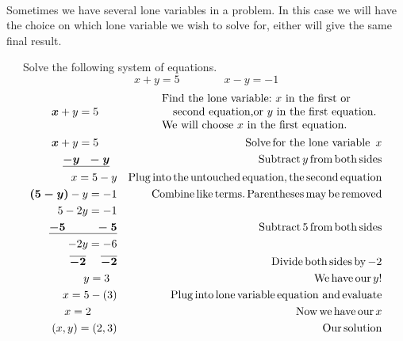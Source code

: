 \vspace{.5in}
~\\

Sometimes we have several lone variables in a problem. In this case we will
have the choice on which lone variable we wish to solve for, either will give
the same final result.

\begin{example}~~~Solve the following system of equations.
    $$x + y = 5\qquad\qquad x - y = - 1$$
  \begin{eqnarray*}
\boldsymbol{x} + y = 5~~~~~ &  & \begin{array}{l}
      \text{Find the lone variable:~}x \text{~in the first or}\\
			\text{~~~second equation,} \text{or~} y \text{~in the first equation.}\\ \text{We will choose~} x \text{~in the first equation}.
    \end{array}\\
    \boldsymbol{x} + y = 5~~~~~ &  & \operatorname{Solve} \operatorname{for~the~lone~variable~} x\\
    \boldsymbol{\underline{- y ~~- y}}~~ &  &  \operatorname{Subtract} y \operatorname{from} \operatorname{both} \operatorname{sides}\\
    x = 5 - y &  & \operatorname{Plug} \operatorname{into} \operatorname{the} \operatorname{untouched}
    \operatorname{equation}, \operatorname{the} \operatorname{second} \operatorname{equation}\\
    \boldsymbol{(5 - y)} - y = - 1 &  & \operatorname{Combine}
    \operatorname{like} \operatorname{terms.} \operatorname{Parentheses}
    \operatorname{may} \operatorname{be} \operatorname{removed} \\
    5 - 2 y = - 1 &  &\\
    \boldsymbol{\underline{- 5 ~~~~~~~~- 5}} &  &  \operatorname{Subtract} 5 \operatorname{from} \operatorname{both}
    \operatorname{sides}\\
    - 2 y = - 6 &  &\\
    \boldsymbol{\overline{- 2} ~~~~ \overline{- 2}} &  &  \operatorname{Divide} \operatorname{both} \operatorname{sides} \operatorname{by} - 2\\
    y = 3~~ &  & \operatorname{We} \operatorname{have} \operatorname{our} y!\\
    x = 5 - (3) &  & \operatorname{Plug} \operatorname{into} \operatorname{lone} \operatorname{variable}
    \operatorname{equation~and} \operatorname{evaluate}\\
    x = 2~~~~~~~ &  & \operatorname{Now} \operatorname{we} \operatorname{have} \operatorname{our} x\\
    (x,y)=(2, 3) &  & \operatorname{Our} \operatorname{solution}
  \end{eqnarray*}
\end{example}

